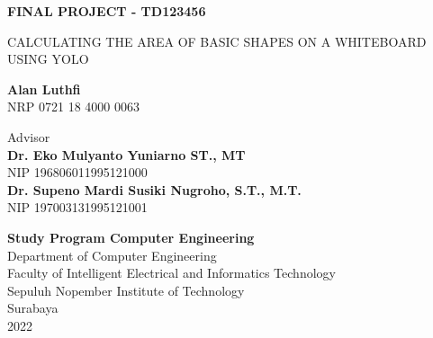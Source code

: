 \begin{flushleft}
  \fontsize{14pt}{17}
  \selectfont
  \textbf{FINAL PROJECT - TD123456}
\end{flushleft}


\vspace{5ex}

\begin{flushleft}
  \fontsize{18pt}{22}
  \selectfont
  CALCULATING THE AREA OF BASIC SHAPES ON A WHITEBOARD USING YOLO
\end{flushleft}

\vspace{6ex}

\begin{flushleft}
  \fontsize{14pt}{17}
  \selectfont
  \textbf{Alan Luthfi}
  \\
  NRP 0721 18 4000 0063
\end{flushleft}

\vspace{6ex}

\begin{flushleft}
  \fontsize{14pt}{17}
  \selectfont
   Advisor \\
  \textbf{Dr. Eko Mulyanto Yuniarno ST., MT} \\
  NIP 196806011995121000 \\
  \textbf{Dr. Supeno Mardi Susiki Nugroho, S.T., M.T.} \\
  NIP 197003131995121001 \\
\end{flushleft}

\vspace{6ex}

\begin{flushleft}
  \fontsize{12pt}{15}
  \selectfont
  \textbf{Study Program Computer Engineering}\\
  Department of Computer Engineering\\
  Faculty of Intelligent Electrical and Informatics Technology\\
  Sepuluh Nopember Institute of Technology\\
  Surabaya\\
  2022
\end{flushleft}
